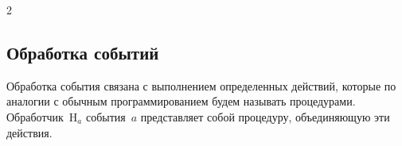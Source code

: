    \begin{multicols}{2}

\subsection{Обработка событий}

    Обработка события связана с выполнением определенных действий, 
которые по аналогии с обычным программированием будем называть 
процедурами. Обработчик~H$_a$ события~$a$ представляет собой 
процедуру, объединяющую эти действия. 

    \begin{table}[b]\small
    \begin{center}
    \vspace*{-12pt}
    \vspace*{2ex}
    

\end{center}
\end{table}
\end{multicols}
